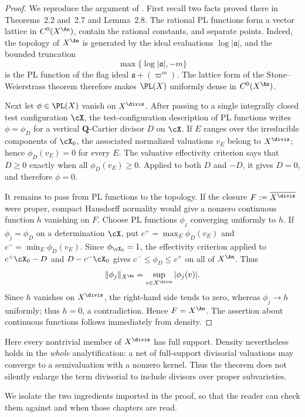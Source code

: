 \begin{proof}
We reproduce the argument of \cite[Theorem~2.14]{BJ22}.  First recall two
facts proved there in Theorems~2.2 and~2.7 and Lemma~2.8.  The rational PL
functions form a vector lattice in $C^0(X^{\An})$, contain the rational
constants, and separate points.  Indeed, the topology of $X^{\An}$ is
generated by the ideal evaluations $\log|\mathfrak a|$, and the bounded
truncation
\[
             \max\{\log|\mathfrak a|,-m\}
\]
is the PL function of the flag ideal
$\mathfrak a+(\varpi^m)$.  The lattice form of the
Stone--Weierstrass theorem therefore makes $\PL(X)$ uniformly dense in
$C^0(X^{\An})$.

Next let $\phi\in\PL(X)$ vanish on $X^{\divis}$.  After passing to a
single integrally closed test configuration $\cX$, the test-configuration
description of PL functions writes $\phi=\phi_D$ for a vertical
$\mathbf Q$-Cartier divisor $D$ on $\cX$.  If $E$ ranges over the
irreducible components of $\cX_0$, the associated normalized valuations
$v_E$ belong to $X^{\divis}$; hence
$\phi_D(v_E)=0$ for every $E$.  The valuative effectivity criterion says
that $D\geq0$ exactly when all $\phi_D(v_E)\geq0$.  Applied to both
$D$ and $-D$, it gives $D=0$, and therefore $\phi=0$.

It remains to pass from PL functions to the topology.  If the closure
$F:=\overline{X^{\divis}}$ were proper, compact Hausdorff normality would
give a nonzero continuous function $h$ vanishing on $F$.  Choose PL
functions $\phi_j$ converging uniformly to $h$.  If
$\phi_j=\phi_D$ on a determination $\cX$, put
$c^+=\max_E\phi_D(v_E)$ and
$c^-=\min_E\phi_D(v_E)$.  Since $\phi_{\cX_0}=1$, the effectivity
criterion applied to $c^+\cX_0-D$ and
$D-c^-\cX_0$ gives
$c^-\leq\phi_D\leq c^+$ on all of $X^{\An}$.  Thus
\[
       \|\phi_j\|_{X^{\An}}
       =\sup_{v\in X^{\divis}}|\phi_j(v)|.
\]
Since $h$ vanishes on $X^{\divis}$, the right-hand side tends to zero,
whereas $\phi_j\to h$ uniformly; thus $h=0$, a contradiction.  Hence
$F=X^{\An}$.  The assertion about continuous functions follows
immediately from density.
\end{proof}

Here every nontrivial member of $X^{\divis}$ has full support.  Density
nevertheless holds in the \emph{whole} analytification: a net of full-support
divisorial valuations may converge to a semivaluation with a nonzero kernel.
Thus the theorem does not silently enlarge the term divisorial to include
divisors over proper subvarieties.

We isolate the two ingredients imported in the proof, so that the reader can
check them against  and
 when those chapters are read.

